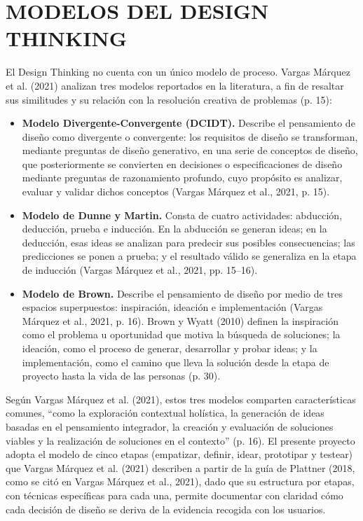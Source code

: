 \section{MODELOS DEL DESIGN THINKING}
El Design Thinking no cuenta con un único modelo de proceso. Vargas Márquez et al. (2021) analizan tres modelos reportados en la literatura, a fin de resaltar sus similitudes y su relación con la resolución creativa de problemas (p. 15):

\begin{itemize}
    \item \textbf{Modelo Divergente-Convergente (DCIDT).} Describe el pensamiento de diseño como divergente o convergente: los requisitos de diseño se transforman, mediante preguntas de diseño generativo, en una serie de conceptos de diseño, que posteriormente se convierten en decisiones o especificaciones de diseño mediante preguntas de razonamiento profundo, cuyo propósito es analizar, evaluar y validar dichos conceptos (Vargas Márquez et al., 2021, p. 15).
    \item \textbf{Modelo de Dunne y Martin.} Consta de cuatro actividades: abducción, deducción, prueba e inducción. En la abducción se generan ideas; en la deducción, esas ideas se analizan para predecir sus posibles consecuencias; las predicciones se ponen a prueba; y el resultado válido se generaliza en la etapa de inducción (Vargas Márquez et al., 2021, pp. 15--16).
    \item \textbf{Modelo de Brown.} Describe el pensamiento de diseño por medio de tres espacios superpuestos: inspiración, ideación e implementación (Vargas Márquez et al., 2021, p. 16). Brown y Wyatt (2010) definen la inspiración como el problema u oportunidad que motiva la búsqueda de soluciones; la ideación, como el proceso de generar, desarrollar y probar ideas; y la implementación, como el camino que lleva la solución desde la etapa de proyecto hasta la vida de las personas (p. 30).
\end{itemize}

Según Vargas Márquez et al. (2021), estos tres modelos comparten características comunes, ``como la exploración contextual holística, la generación de ideas basadas en el pensamiento integrador, la creación y evaluación de soluciones viables y la realización de soluciones en el contexto'' (p. 16). El presente proyecto adopta el modelo de cinco etapas (empatizar, definir, idear, prototipar y testear) que Vargas Márquez et al. (2021) describen a partir de la guía de Plattner (2018, como se citó en Vargas Márquez et al., 2021), dado que su estructura por etapas, con técnicas específicas para cada una, permite documentar con claridad cómo cada decisión de diseño se deriva de la evidencia recogida con los usuarios.

